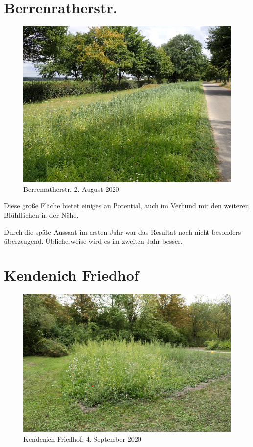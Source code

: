 \documentclass[10pt]{article}
\begin{document}
\section{Berrenratherstr.}
\begin{figure}[h!]
  \includegraphics[width=\linewidth]{img/berrenrather/august.jpg}
  \caption{Berrenratherstr. 2. August 2020}
\end{figure}

Diese große Fläche bietet einiges an Potential, auch im Verbund mit den weiteren Blühflächen in der Nähe.

Durch die späte Aussaat im ersten Jahr war das Resultat noch nicht besonders überzeugend. Üblicherweise wird es im zweiten Jahr besser.

\clearpage
\section{Kendenich Friedhof}
\begin{figure}[h!]
  \includegraphics[width=\linewidth]{img/kendenich/september.jpg}
  \caption{Kendenich Friedhof. 4. September 2020}
\end{figure}
\end{document}
